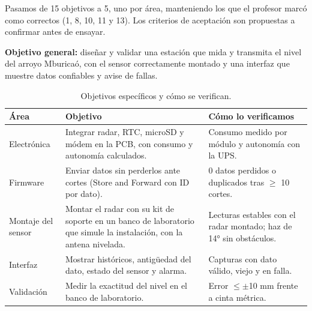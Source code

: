 \documentclass[11pt,a4paper]{article}
\begin{document}
Pasamos de 15 objetivos a 5, uno por área, manteniendo los que el profesor
marcó como correctos (1, 8, 10, 11 y 13). Los criterios de aceptación son
propuestas a confirmar antes de ensayar.

\textbf{Objetivo general:} diseñar y validar una estación que mida y transmita
el nivel del arroyo Mburicaó, con el sensor correctamente montado y una
interfaz que muestre datos confiables y avise de fallas.

\begin{table}[H]
    \centering
    \caption{Objetivos específicos y cómo se verifican.}
    \begin{tabularx}{\textwidth}{>{\raggedright\arraybackslash}p{2.2cm}LL}
        \toprule
        \textbf{Área} & \textbf{Objetivo} & \textbf{Cómo lo verificamos} \\
        \midrule
        Electrónica & Integrar radar, RTC, microSD y módem en la PCB, con
            consumo y autonomía calculados. & Consumo medido por módulo y
            autonomía con la UPS. \\
        Firmware & Enviar datos sin perderlos ante cortes (Store and Forward
            con ID por dato). & 0 datos perdidos o duplicados tras $\geq$ 10
            cortes. \\
        Montaje del sensor & Montar el radar con su kit de soporte en un
            banco de laboratorio que simule la instalación, con la antena
            nivelada. & Lecturas
            estables con el radar montado; haz de 14° sin obstáculos. \\
        Interfaz & Mostrar históricos, antigüedad del dato, estado del sensor
            y alarma. & Capturas con dato válido, viejo y en falla. \\
        Validación & Medir la exactitud del nivel en el banco de laboratorio. &
            Error $\leq \pm$10 mm frente a cinta métrica. \\
        \bottomrule
    \end{tabularx}
\end{table}
\end{document}
